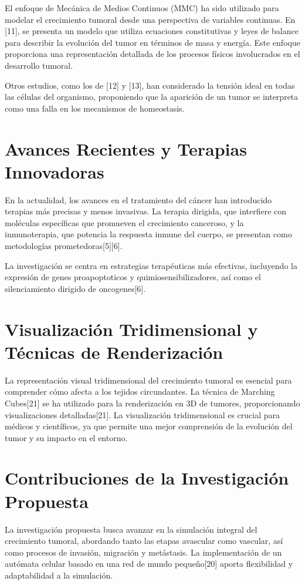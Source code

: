 El enfoque de Mecánica de Medios Continuos (MMC) ha sido utilizado para modelar el crecimiento tumoral desde una perspectiva de variables continuas. En [11], se presenta un modelo que utiliza ecuaciones constitutivas y leyes de balance para describir la evolución del tumor en términos de masa y energía. Este enfoque proporciona una representación detallada de los procesos físicos involucrados en el desarrollo tumoral.

Otros estudios, como los de [12] y [13], han considerado la tensión ideal en todas las células del organismo, proponiendo que la aparición de un tumor se interpreta como una falla en los mecanismos de homeostasis.

\section{Avances Recientes y Terapias Innovadoras}

En la actualidad, los avances en el tratamiento del cáncer han introducido terapias más precisas y menos invasivas. La terapia dirigida, que interfiere con moléculas específicas que promueven el crecimiento canceroso, y la inmunoterapia, que potencia la respuesta inmune del cuerpo, se presentan como metodologías prometedoras[5][6].

La investigación se centra en estrategias terapéuticas más efectivas, incluyendo la expresión de genes proapoptoticos y quimiosensibilizadores, así como el silenciamiento dirigido de oncogenes[6].

\section{Visualización Tridimensional y Técnicas de Renderización}

La representación visual tridimensional del crecimiento tumoral es esencial para comprender cómo afecta a los tejidos circundantes. La técnica de Marching Cubes[21] se ha utilizado para la renderización en 3D de tumores, proporcionando visualizaciones detalladas[21]. La visualización tridimensional es crucial para médicos y científicos, ya que permite una mejor comprensión de la evolución del tumor y su impacto en el entorno.

\section{Contribuciones de la Investigación Propuesta}

La investigación propuesta busca avanzar en la simulación integral del crecimiento tumoral, abordando tanto las etapas avascular como vascular, así como procesos de invasión, migración y metástasis. La implementación de un autómata celular basado en una red de mundo pequeño[20] aporta flexibilidad y adaptabilidad a la simulación.

